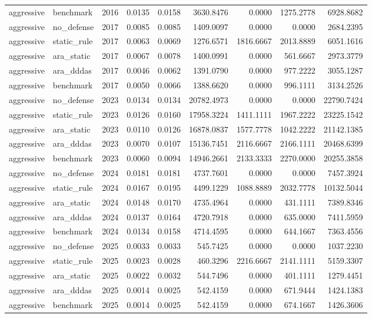 \begin{tabular}{llrrrrrrr}
aggressive & benchmark & 2016 & 0.0135 & 0.0158 & 3630.8476 & 0.0000 & 1275.2778 & 6928.8682 \\
aggressive & no_defense & 2017 & 0.0085 & 0.0085 & 1409.0097 & 0.0000 & 0.0000 & 2684.2395 \\
aggressive & static_rule & 2017 & 0.0063 & 0.0069 & 1276.6571 & 1816.6667 & 2013.8889 & 6051.1616 \\
aggressive & ara_static & 2017 & 0.0067 & 0.0078 & 1400.0991 & 0.0000 & 561.6667 & 2973.3779 \\
aggressive & ara_dddas & 2017 & 0.0046 & 0.0062 & 1391.0790 & 0.0000 & 977.2222 & 3055.1287 \\
aggressive & benchmark & 2017 & 0.0050 & 0.0066 & 1388.6620 & 0.0000 & 996.1111 & 3134.2526 \\
aggressive & no_defense & 2023 & 0.0134 & 0.0134 & 20782.4973 & 0.0000 & 0.0000 & 22790.7424 \\
aggressive & static_rule & 2023 & 0.0126 & 0.0160 & 17958.3224 & 1411.1111 & 1967.2222 & 23225.1542 \\
aggressive & ara_static & 2023 & 0.0110 & 0.0126 & 16878.0837 & 1577.7778 & 1042.2222 & 21142.1385 \\
aggressive & ara_dddas & 2023 & 0.0070 & 0.0107 & 15136.7451 & 2116.6667 & 2166.1111 & 20468.6399 \\
aggressive & benchmark & 2023 & 0.0060 & 0.0094 & 14946.2661 & 2133.3333 & 2270.0000 & 20255.3858 \\
aggressive & no_defense & 2024 & 0.0181 & 0.0181 & 4737.7601 & 0.0000 & 0.0000 & 7457.3924 \\
aggressive & static_rule & 2024 & 0.0167 & 0.0195 & 4499.1229 & 1088.8889 & 2032.7778 & 10132.5044 \\
aggressive & ara_static & 2024 & 0.0148 & 0.0170 & 4735.4964 & 0.0000 & 431.1111 & 7389.8346 \\
aggressive & ara_dddas & 2024 & 0.0137 & 0.0164 & 4720.7918 & 0.0000 & 635.0000 & 7411.5959 \\
aggressive & benchmark & 2024 & 0.0134 & 0.0158 & 4714.4595 & 0.0000 & 644.1667 & 7363.4556 \\
aggressive & no_defense & 2025 & 0.0033 & 0.0033 & 545.7425 & 0.0000 & 0.0000 & 1037.2230 \\
aggressive & static_rule & 2025 & 0.0023 & 0.0028 & 460.3296 & 2216.6667 & 2141.1111 & 5159.3307 \\
aggressive & ara_static & 2025 & 0.0022 & 0.0032 & 544.7496 & 0.0000 & 401.1111 & 1279.4451 \\
aggressive & ara_dddas & 2025 & 0.0014 & 0.0025 & 542.4159 & 0.0000 & 671.9444 & 1424.1383 \\
aggressive & benchmark & 2025 & 0.0014 & 0.0025 & 542.4159 & 0.0000 & 674.1667 & 1426.3606 \\
\bottomrule
\end{tabular}
